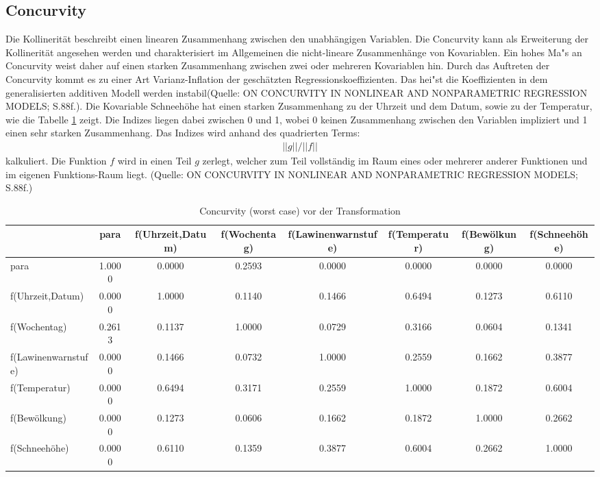\documentclass[12pt]{scrreprt}
\begin{document}
\subsection{Concurvity}
Die Kollinerität beschreibt einen linearen Zusammenhang zwischen den unabhängigen Variablen. Die Concurvity kann als Erweiterung der Kollinerität angesehen werden und charakterisiert im Allgemeinen die nicht-lineare Zusammenhänge von Kovariablen. Ein hohes Ma"s an Concurvity weist daher auf einen starken Zusammenhang zwischen zwei oder mehreren Kovariablen hin. Durch das Auftreten der Concurvity kommt es zu einer Art Varianz-Inflation der geschätzten Regressionskoeffizienten. Das hei"st die Koeffizienten in dem generalisierten additiven Modell werden instabil(Quelle: ON CONCURVITY IN NONLINEAR AND NONPARAMETRIC REGRESSION MODELS; S.88f.). Die Kovariable Schneehöhe hat einen starken Zusammenhang zu der Uhrzeit und dem Datum, sowie zu der Temperatur, wie die Tabelle \ref{con1} zeigt. Die Indizes liegen dabei zwischen 0 und 1, wobei 0 keinen Zusammenhang zwischen den Variablen impliziert und 1 einen sehr starken Zusammenhang. Das Indizes wird anhand des quadrierten Terms:
\begin{align}
||g||/||f|| 
\end{align}
kalkuliert.
Die Funktion $f$ wird in einen Teil $g$ zerlegt, welcher zum Teil vollständig im Raum eines oder mehrerer anderer Funktionen und im eigenen Funktions-Raum liegt.  (Quelle: ON CONCURVITY IN NONLINEAR AND NONPARAMETRIC REGRESSION MODELS; S.88f.)
\begin{table}[htbp]
	\centering
	\vspace{-1em}
	\caption{Concurvity (worst case) vor der Transformation}
	\begin{adjustbox}{max width=\textwidth}
	\begin{tabular}{lccccccc}
		& para & f(Uhrzeit,Datum) & f(Wochentag) & f(Lawinenwarnstufe) & f(Temperatur) & f(Bewölkung) & f(Schneehöhe) \\
		\midrule
		\midrule
		para  & 1.0000 & 0.0000 & 0.2593 & 0.0000 & 0.0000 & 0.0000 & 0.0000 \\
		f(Uhrzeit,Datum) & 0.0000 & 1.0000 & 0.1140 & 0.1466 & 0.6494 & 0.1273 & \cellcolor{blue!25}0.6110 \\
		f(Wochentag) & 0.2613 & 0.1137 & 1.0000 & 0.0729 & 0.3166 & 0.0604 & 0.1341 \\
		f(Lawinenwarnstufe) & 0.0000 & 0.1466 & 0.0732 & 1.0000 & 0.2559 & 0.1662 & 0.3877 \\
		f(Temperatur) & 0.0000 & 0.6494 & 0.3171 & 0.2559 & 1.0000 & 0.1872 & \cellcolor{blue!25}0.6004 \\
		f(Bewölkung) & 0.0000 & 0.1273 & 0.0606 & 0.1662 & 0.1872 & 1.0000 & 0.2662 \\
		f(Schneehöhe) & 0.0000 & 0.6110  & 0.1359 & 0.3877 & 0.6004 & 0.2662 & 1.0000 \\
		\bottomrule
	\end{tabular}%
	\label{con1}%
	\end{adjustbox}
\end{table}%
\end{document}
